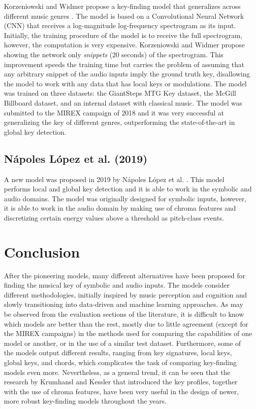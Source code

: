 Korzeniowski and Widmer propose a key-finding model that generalizes across different music genres \cite{korzeniowski_genre-agnostic_2018}. The model is based on a Convolutional Neural Network (CNN) that receives a log-magnitude log-frequency spectrogram as its input. Initially, the training procedure of the model is to receive the full spectrogram, however, the computation is very expensive. Korzeniowski and Widmer propose showing the network only \emph{snippets} (20 seconds) of the spectrogram. This improvement speeds the training time but carries the problem of assuming that any arbitrary snippet of the audio inputs imply the ground truth key, disallowing the model to work with any data that has local keys or modulations. The model was trained on three datasets: the GiantSteps MTG Key dataset, the McGill Billboard dataset, and an internal dataset with classical music. The model was submitted to the MIREX campaign of 2018 and it was very successful at generalizing the key of different genres, outperforming the state-of-the-art in global key detection.


\subsection{N\'apoles L\'opez et al. (2019)}
A new model was proposed in 2019 by N\'apoles L\'opez et al. \cite{napoles_lopez_key-finding_2019}. This model performs local and global key detection and it is able to work in the symbolic and audio domains. The model was originally designed for symbolic inputs, however, it is able to work in the audio domain by making use of chroma features \cite{mauch_approximate_2010} and discretizing certain energy values above a threshold as pitch-class events.

\section{Conclusion}
After the pioneering models, many different alternatives have been proposed for finding the musical key of symbolic and audio inputs. The models consider different methodologies, initially inspired by music perception and cognition and slowly transitioning into data-driven and machine learning approaches. As may be observed from the evaluation sections of the literature, it is difficult to know which models are better than the rest, mostly due to little agreement (except for the MIREX campaigns) in the methods used for comparing the capabilities of one model or another, or in the use of a similar test dataset. Furthermore, some of the models output different results, ranging from key signatures, local keys, global keys, and chords, which complicates the task of comparing key-finding models even more. Nevertheless, as a general trend, it can be seen that the research by Krumhansl and Kessler that introduced the key profiles, together with the use of chroma features, have been very useful in the design of newer, more robust key-finding models throughout the years. 

